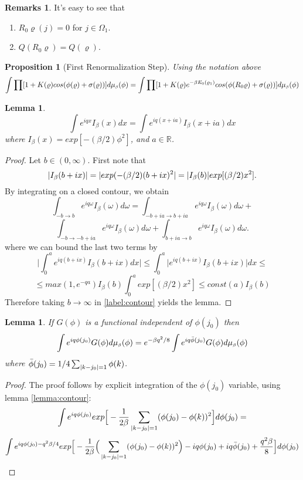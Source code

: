 \documentclass[11pt,reqno]{article}
\DeclarePairedDelimiter\abs{\lvert}{\rvert}%
\newtheorem{lemma}[thm]{Lemma}
\newtheorem{prop}[thm]{Proposition}
\theoremstyle{definition}
\newtheorem*{remarks}{Remarks}
\numberwithin{equation}{section}
\begin{document}
\begin{remarks}
It's easy to see that
\begin{enumerate}
\item $R_0\varrho(j) = 0$ for $j\in\Omega_1$.
\item $Q(R_0\varrho) = Q(\varrho)$.
\end{enumerate}
\end{remarks}


\begin{prop}[First Renormalization Step] \label{prop:lem418}
Using the notation above
$$
\int \prod [1+K(\varrho)cos(\phi(\varrho) + \sigma(\varrho))] d\mu_{\text{\tiny$\beta$}}(\phi) = 
\int \prod [1+K(\varrho)e^{-\beta E_0(\varrho_1)}cos(\phi(R_0\varrho) + \sigma(\varrho))] d\mu_{\text{\tiny$\beta$}}(\phi)
$$
\end{prop}


\begin{lemma} \label{lemma:contour}
\begin{equation}
\int e^{i q x} I_\beta(x)dx = \int e^{i q (x+ia)} I_\beta(x+ia)dx
\end{equation}
where $I_\beta(x) = exp[-(\beta/2)\phi^2]$, and $a\in \mathbb{R}$.
\end{lemma}
\begin{proof}
Let $b \in (0,\infty)$. First note that 
$$
\abs{I_\beta(b+ix)} = \abs{exp(-(\beta/2) (b+ix)^2} = \abs{I_\beta(b)}exp[(\beta/2)x^2].
$$
By integrating on a closed contour, we obtain
$$
\int_{-b \rightarrow b} e^{i q \omega} I_\beta(\omega)d\omega =
\int_{-b+ia \rightarrow b+ia} e^{i q \omega} I_\beta(\omega)d\omega + 
$$
\begin{equation} \label{label:contour}
\int_{-b \rightarrow -b+ia} e^{i q \omega} I_\beta(\omega)d\omega +
\int_{b+ia \rightarrow b} e^{i q \omega} I_\beta(\omega)d\omega.
\end{equation}
where we can bound the last two terms by
$$
\Bigg| \int_0^a e^{iq(b+ix)}I_\beta(b+ix)dx \Bigg| \leq 
\int_0^a \Big| e^{iq(b+ix)}I_\beta(b+ix)\Big| dx \leq
$$
$$
\leq max(1, e^{-qa}) I_\beta(b) \int_0^a exp[(\beta/2)x^2] \leq const(a)I_\beta(b)
$$
Therefore taking $b\rightarrow\infty$ in \eqref{label:contour} yields the lemma.
\end{proof}

\begin{lemma} \label{lemma:lem42}
If $G(\phi)$ is a functional independent of $\phi(j_0)$ then
\begin{equation}
\int e^{i q \phi(j_0)} G(\phi)d\mu_{\text{\tiny$\beta$}}(\phi) = e^{-\beta q^2/8} \int e^{i q \bar{\phi}(j_0)} G(\phi)d\mu_{\text{\tiny$\beta$}}(\phi)
\end{equation}
where $\bar{\phi}(j_0)=1/4\sum_{\abs{k-j_0}=1} \phi(k)$.
\end{lemma}
\begin{proof}
The proof follows by explicit integration of the $\phi(j_0)$ variable, using lemma \eqref{lemma:contour}:
$$
\int e^{i q \phi(j_0)} exp \Big[ -\frac{1}{2\beta} \sum_{\abs{k-j_0}=1}(\phi(j_0)-\phi(k))^2 \Big] d\phi(j_0) =
$$
$$
\int e^{i q \phi(j_0) - q^2\beta/4} exp \Big[ -\frac{1}{2\beta} \Big( \sum_{\abs{k-j_0}=1}(\phi(j_0)-\phi(k))^2 \Big) - i q \phi(j_0) + iq\bar{\phi}(j_0) + \frac{q^2\beta}{8}\Big] d\phi(j_0)
$$
\end{proof}
\end{document}
